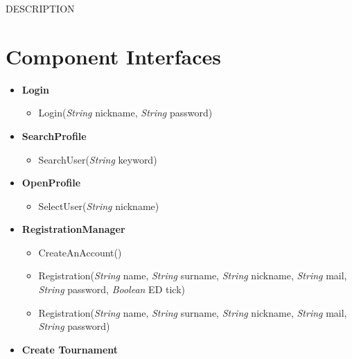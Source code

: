 DESCRIPTION





\section{Component Interfaces}
\label{sec:component_interfaces}%
\begin{itemize}
    \item \textbf{\textbf{Login}}
    \begin{itemize}

\item Login(\textit{String} nickname, \textit{String} password)
\end{itemize}
    \item \textbf{\textbf{SearchProfile}}


    \begin{itemize}

\item SearchUser(\textit{String} keyword)
\end{itemize}


    \item \textbf{\textbf{OpenProfile}}
    \begin{itemize}

\item SelectUser(\textit{String} nickname)

\end{itemize}


    \item \textbf{\textbf{RegistrationManager}}

\begin{itemize}
        \item CreateAnAccount()
        \item Registration(\textit{String} name, \textit{String} surname, \textit{String} nickname, \textit{String} mail, \textit{String} password, \textit{Boolean}  ED tick)
        \item Registration(\textit{String} name, \textit{String} surname, \textit{String} nickname, \textit{String} mail, \textit{String} password)
\end{itemize}

    \item \textbf{\textbf{Create Tournament}}


\end{itemize}
